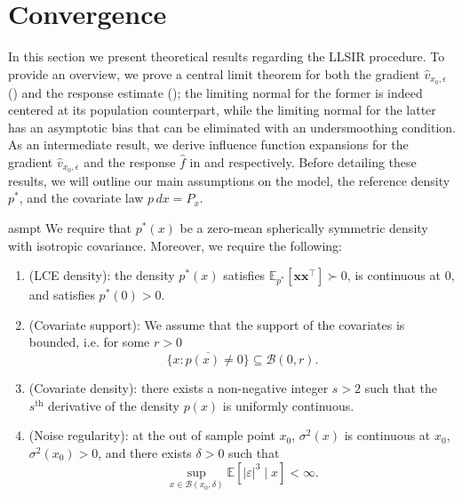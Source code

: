 \documentclass[11pt]{article}
\begin{document}
\section{Convergence} \label{sec: theoretical results}

In this section we present theoretical results regarding the LLSIR procedure. To provide an overview, we prove a central limit theorem for both the gradient $\hat{v}_{x_0, \epsilon}$ () and the response estimate (); the limiting normal for the former is indeed centered at its population counterpart, while the limiting normal for the latter has an asymptotic bias that can be eliminated with an undersmoothing condition. As an intermediate result, we derive influence function expansions for the gradient $\hat{v}_{x_0, \epsilon}$ and the response $\hat f$ in  and  respectively. Before detailing these results, we will outline our main assumptions on the model, the reference density $p^*$, and the covariate law $p \, dx = P_x$.

\begin{restatable}{asmpt}{} \label{assumption: lce and covariate density}
    We require that $p^*(x)$ be a zero-mean spherically symmetric density with isotropic covariance. Moreover, we require the following:
    \begin{enumerate}
        \item (LCE density): the density $p^*(x)$ satisfies $\mathbb{E}_{p^*}[\boldsymbol{x}\boldsymbol{x}^{\top}] \succ 0$, is continuous at $0$, and satisfies $p^*(0)>0$.
        \item (Covariate support): We assume that the support of the covariates is bounded, i.e.  for some $r > 0$ \[\overline{\{x : p(x) \neq 0\}} \subseteq \mathcal{B}(0, r).\]
        \item (Covariate density): there exists a non-negative integer $s > 2$ such that the $s^{\text{th}}$ derivative of the density $p(x)$ is uniformly continuous.
        \item (Noise regularity): at the out of sample point $x_0$, $\sigma^2(x)$ is continuous at $x_0$, $\sigma^2(x_0)>0$, and there exists $\delta>0$ such that
        \[
            \sup_{x\in\mathcal{B}(x_0,\delta)}
            \mathbb{E}[|\varepsilon|^3\mid x] < \infty.
        \]
    \end{enumerate}
\end{restatable}
\end{document}
